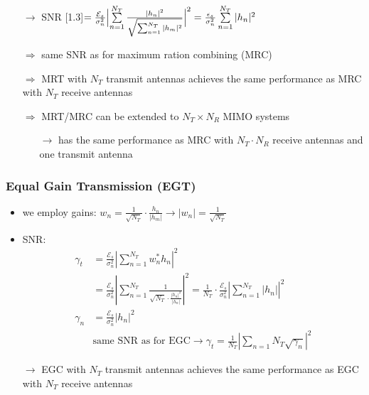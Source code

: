\documentclass[a4paper, 10pt]{article}
\begin{document}
\begin{itemize}
\begin{itemize}
		\end{itemize}
		\item[$\rightarrow$] SNR \scalebox{1.3}[1.3]{$ = \frac{\mathcal{E}_s}{\sigma _n^2}\Bigl | \sum\limits_{n = 1}^{N_T}\frac{|h_n|^2}{\sqrt{\sum_{n = 1}^{N_T}|h_m|^2}}\Bigr |^2 = \frac{\epsilon _s}{\sigma _n^2}\sum\limits_{n = 1}^{N_T}|h_n|^2 $}
		\item[$\Rightarrow$] same SNR as for maximum ration combining (MRC)
		\item[$\Rightarrow$] MRT with $N_T$ transmit antennas achieves the same performance as MRC with $N_T$ receive antennas
		\item[$\Rightarrow$] MRT/MRC can be extended to $ N_T\times N_R $ MIMO systems
		\begin{itemize}
			\item[$\rightarrow$] has the same performance as MRC with $N_T\cdot N_R$ receive antennas and one transmit antenna
		\end{itemize}
	\end{itemize}
\subsubsection*{Equal Gain Transmission (EGT)}
\begin{itemize}
	\item we employ gains: $w_n = \frac{1}{\sqrt{N_T}}\cdot \frac{h_n}{|h_m|} \rightarrow |w_n| = \frac{1}{\sqrt{N_T}} $
	\item SNR:
	\begin{align*}
		\gamma _t &= \frac{\mathcal{E}_s}{\sigma _n^2}\left|\sum_{n = 1}^{N_T} w_n^*h_n \right |^2\\
		&= \frac{\mathcal{E}_s}{\sigma _n^2}\left|\sum_{n = 1}^{N_T}\frac{1}{\sqrt{N_T}\cdot \frac{|h_n|^2}{|h_n|}} \right|^2 = \frac{1}{N_T}\cdot \frac{\mathcal{E}_s}{\sigma _n^2} \left|\sum_{n = 1}^{N_T}|h_n| \right|^2\\
		\gamma _n &= \frac{\mathcal{E}_s}{\sigma _n^2}|h_n|^2\\
		&\text{same SNR as for EGC} \rightarrow \gamma _t = \frac{1}{N_T} \left| \sum_{n = 1}{N_T}\sqrt{\gamma _n} \right|^2
	\end{align*}
	\item[$\rightarrow$] EGC with $ N_T$ transmit antennas achieves the same performance as EGC with $ N_T$ receive antennas
\end{itemize}
\end{document}
